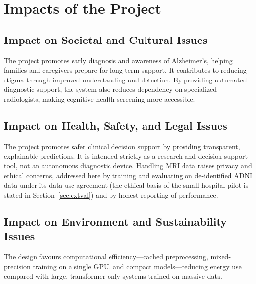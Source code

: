 \section{Impacts of the Project}
\subsection{Impact on Societal and Cultural Issues}
The project promotes early diagnosis and awareness of Alzheimer's, helping families and caregivers prepare for long-term support. It contributes to reducing stigma through improved understanding and detection. By providing automated diagnostic support, the system also reduces dependency on specialized radiologists, making cognitive health screening more accessible.

\subsection{Impact on Health, Safety, and Legal Issues}
The project promotes safer clinical decision support by providing transparent, explainable predictions. It is intended strictly as a research and decision-support tool, not an autonomous diagnostic device. Handling MRI data raises privacy and ethical concerns, addressed here by training and evaluating on de-identified ADNI data under its data-use agreement (the ethical basis of the small hospital pilot is stated in Section~\ref{sec:extval}) and by honest reporting of performance.

\subsection{Impact on Environment and Sustainability Issues}
The design favours computational efficiency—cached preprocessing, mixed-precision training on a single GPU, and compact models—reducing energy use compared with large, transformer-only systems trained on massive data.

